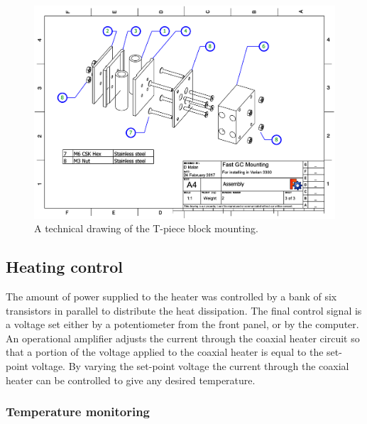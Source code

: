 \begin{figure}
	\centering
	\includegraphics[angle=90, origin=c, width=\textwidth]{Figures/CarDrawing3.pdf}
	\decoRule	
	\caption[Technical drawing of coaxial heater mounting.]{A technical drawing of the T-piece block mounting.} 
	\label{fig:CarsDrawing3}
\end{figure}


\subsection{Heating control}

The amount of power supplied to the heater was controlled by a bank of six
transistors in parallel to distribute the heat dissipation. The final control
signal is a voltage set either by a potentiometer from the front panel, or by
the computer. An operational amplifier adjusts the current through the coaxial
heater circuit so that a portion of the voltage applied to the coaxial heater is
equal to the set-point voltage. By varying the set-point voltage the current
through the coaxial heater can be controlled to give any desired temperature.

\subsubsection{Temperature monitoring}

